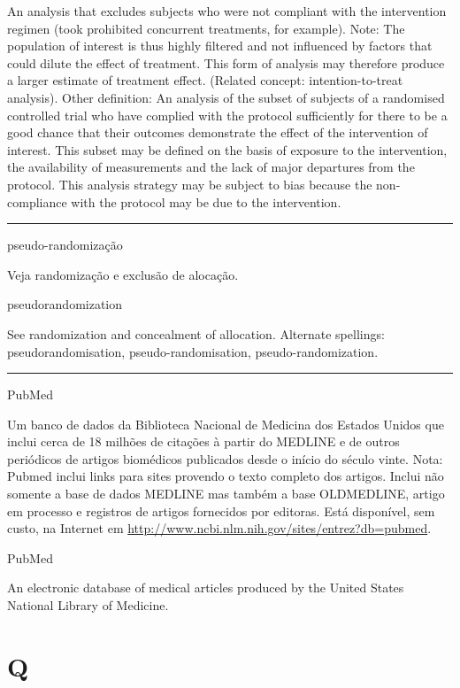 \documentclass[
  openany]{book}
\begin{document}
An analysis that excludes subjects who were not compliant with the intervention regimen (took prohibited concurrent treatments, for example). Note: The population of interest is thus highly filtered and not influenced by factors that could dilute the effect of treatment. This form of analysis may therefore produce a larger estimate of treatment effect. (Related concept: intention-to-treat analysis). Other definition: An analysis of the subset of subjects of a randomised controlled trial who have complied with the protocol sufficiently for there to be a good chance that their outcomes demonstrate the effect of the intervention of interest. This subset may be defined on the basis of exposure to the intervention, the availability of measurements and the lack of major departures from the protocol. This analysis strategy may be subject to bias because the non-compliance with the protocol may be due to the intervention.

\begin{center}\rule{0.5\linewidth}{0.5pt}\end{center}

pseudo-randomização

Veja randomização e exclusão de alocação.

pseudorandomization

See randomization and concealment of allocation. Alternate spellings: pseudorandomisation, pseudo-randomisation, pseudo-randomization.

\begin{center}\rule{0.5\linewidth}{0.5pt}\end{center}

PubMed

Um banco de dados da Biblioteca Nacional de Medicina dos Estados Unidos que inclui cerca de 18 milhões de citações à partir do MEDLINE e de outros periódicos de artigos biomédicos publicados desde o início do século vinte. Nota: Pubmed inclui links para sites provendo o texto completo dos artigos. Inclui não somente a base de dados MEDLINE mas também a base OLDMEDLINE, artigo em processo e registros de artigos fornecidos por editoras. Está disponível, sem custo, na Internet em \url{http://www.ncbi.nlm.nih.gov/sites/entrez?db=pubmed}.

PubMed

An electronic database of medical articles produced by the United States National Library of Medicine.

\hypertarget{q}{%
\chapter*{Q}\label{q}}
\end{document}
